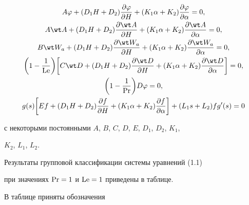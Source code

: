 \begin{gather*} 


A\varphi+(D_1H+D_2)\frac{\partial\varphi}{\partial H} 


+(K_1\alpha+K_2)\frac{\partial\varphi}{\partial\alpha}=0,\\ 


% 


A\wt A+(D_1H+D_2)\frac{\partial\wt A}{\partial H} 


+(K_1\alpha+K_2)\frac{\partial\wt A}{\partial\alpha}=0, \\ 


% 


B\wt W_a+(D_1H+D_2)\frac{\partial\wt W_a}{\partial H} 


+(K_1\alpha+K_2)\frac{\partial\wt W_a}{\partial\alpha}=0, \\ 


% 


\bigg(1-\frac{1}{\Le}\bigg)\bigg[C\wt D+(D_1H+D_2) 


\frac{\partial\wt D}{\partial H}+(K_1\alpha+K_2) 


\frac{\partial\wt D}{\partial\alpha}\bigg]=0, \\ 


\bigg(1-\frac{1}{\PR}\bigg)D\varphi=0, \\ 


% 


g(s)\bigg[E f+(D_1H+D_2)\frac{\partial f}{\partial H}+ 


(K_1\alpha+K_2)\frac{\partial f}{\partial\alpha}\bigg] 


+(L_1s+L_2)f g'(s)=0 


\end{gather*} 


с некоторыми постоянными $A$, $B$, $C$, $D$, $E$, $D_1$, $D_2$, $K_1$, 


$K_2$, $L_1$, $L_2$. 


 


Результаты групповой классификации системы уравнений (1.1) 


при значениях $\operatorname{Pr}=1$ и $\operatorname{Le}=1$ приведены в таблице. 


 


В таблице приняты обозначения 


